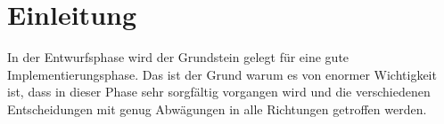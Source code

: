 \section{Einleitung}

In der Entwurfsphase wird der Grundstein gelegt für eine gute Implementierungsphase. Das ist der Grund warum es von enormer Wichtigkeit ist, dass in dieser Phase sehr sorgfältig vorgangen wird  und die verschiedenen Entscheidungen mit genug Abwägungen in alle Richtungen getroffen werden. 